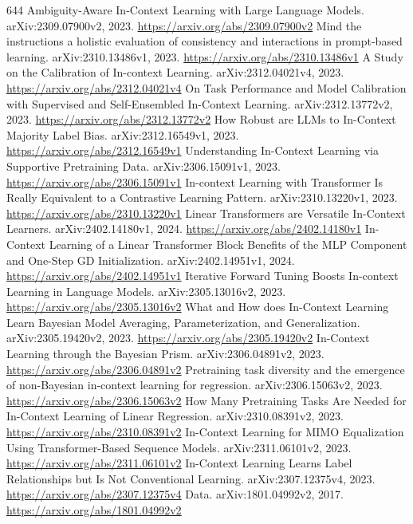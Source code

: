 \documentclass[11pt]{article}
\begin{document}
\begin{thebibliography}{644}
 Ambiguity-Aware In-Context Learning with Large Language Models. arXiv:2309.07900v2, 2023. \url{https://arxiv.org/abs/2309.07900v2}
 Mind the instructions a holistic evaluation of consistency and interactions in prompt-based learning. arXiv:2310.13486v1, 2023. \url{https://arxiv.org/abs/2310.13486v1}
 A Study on the Calibration of In-context Learning. arXiv:2312.04021v4, 2023. \url{https://arxiv.org/abs/2312.04021v4}
 On Task Performance and Model Calibration with Supervised and Self-Ensembled In-Context Learning. arXiv:2312.13772v2, 2023. \url{https://arxiv.org/abs/2312.13772v2}
 How Robust are LLMs to In-Context Majority Label Bias. arXiv:2312.16549v1, 2023. \url{https://arxiv.org/abs/2312.16549v1}
 Understanding In-Context Learning via Supportive Pretraining Data. arXiv:2306.15091v1, 2023. \url{https://arxiv.org/abs/2306.15091v1}
 In-context Learning with Transformer Is Really Equivalent to a Contrastive Learning Pattern. arXiv:2310.13220v1, 2023. \url{https://arxiv.org/abs/2310.13220v1}
 Linear Transformers are Versatile In-Context Learners. arXiv:2402.14180v1, 2024. \url{https://arxiv.org/abs/2402.14180v1}
 In-Context Learning of a Linear Transformer Block Benefits of the MLP Component and One-Step GD Initialization. arXiv:2402.14951v1, 2024. \url{https://arxiv.org/abs/2402.14951v1}
 Iterative Forward Tuning Boosts In-context Learning in Language Models. arXiv:2305.13016v2, 2023. \url{https://arxiv.org/abs/2305.13016v2}
 What and How does In-Context Learning Learn Bayesian Model Averaging, Parameterization, and Generalization. arXiv:2305.19420v2, 2023. \url{https://arxiv.org/abs/2305.19420v2}
 In-Context Learning through the Bayesian Prism. arXiv:2306.04891v2, 2023. \url{https://arxiv.org/abs/2306.04891v2}
 Pretraining task diversity and the emergence of non-Bayesian in-context learning for regression. arXiv:2306.15063v2, 2023. \url{https://arxiv.org/abs/2306.15063v2}
 How Many Pretraining Tasks Are Needed for In-Context Learning of Linear Regression. arXiv:2310.08391v2, 2023. \url{https://arxiv.org/abs/2310.08391v2}
 In-Context Learning for MIMO Equalization Using Transformer-Based Sequence Models. arXiv:2311.06101v2, 2023. \url{https://arxiv.org/abs/2311.06101v2}
 In-Context Learning Learns Label Relationships but Is Not Conventional Learning. arXiv:2307.12375v4, 2023. \url{https://arxiv.org/abs/2307.12375v4}
 Data. arXiv:1801.04992v2, 2017. \url{https://arxiv.org/abs/1801.04992v2}

\end{thebibliography}
\end{document}
